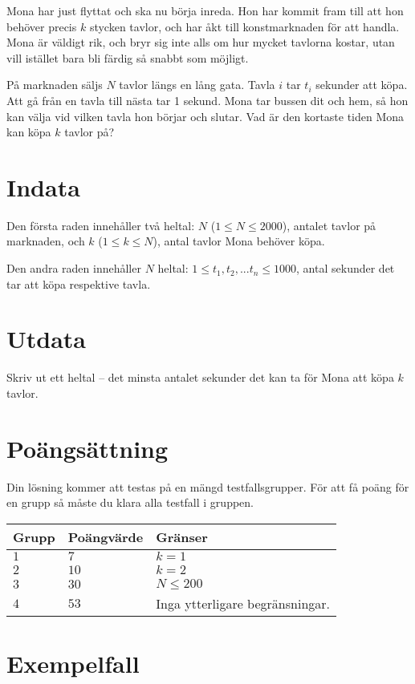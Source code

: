 Mona har just flyttat och ska nu börja inreda. Hon har kommit fram till att hon behöver precis $k$ stycken tavlor, och har åkt till konstmarknaden för att handla. Mona är väldigt rik, och bryr sig inte alls om hur mycket tavlorna kostar, utan vill istället bara bli färdig så snabbt som möjligt. 

På marknaden säljs $N$ tavlor längs en lång gata. Tavla $i$ tar $t_i$ sekunder att köpa. Att gå från en tavla till nästa tar 1 sekund. Mona tar bussen dit och hem, så hon kan välja vid vilken tavla hon börjar och slutar. Vad är den kortaste tiden Mona kan köpa $k$ tavlor på?

\section*{Indata}
Den första raden innehåller två heltal: $N$ ($1 \le N \le 2000$), antalet tavlor på marknaden, och $k$ ($1 \le k \le N$), antal tavlor Mona behöver köpa.

Den andra raden innehåller $N$ heltal: $1 \le t_1,t_2,...t_n \le 1000$, antal sekunder det tar att köpa respektive tavla.

\section*{Utdata}
Skriv ut ett heltal -- det minsta antalet sekunder det kan ta för Mona att köpa $k$ tavlor.

\section*{Poängsättning}
Din lösning kommer att testas på en mängd testfallsgrupper.
För att få poäng för en grupp så måste du klara alla testfall i gruppen.

\noindent
\begin{tabular}{| l | l | l |}
  \hline
  Grupp & Poängvärde & Gränser \\ \hline
  $1$    & $7$        &  $k=1$ \\ \hline 
  $2$    & $10$        &  $k=2$ \\ \hline
  $3$    & $30$        &  $N \le 200$ \\ \hline 
  $4$    & $53$       &  Inga ytterligare begränsningar. \\ \hline
\end{tabular}

\section*{Exempelfall}
